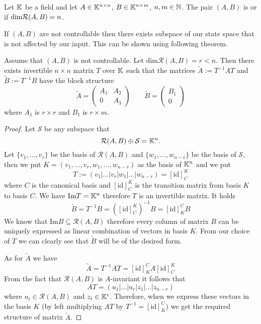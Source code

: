 \begin{definition}
	Let $\mathbb{K}$ be a field and let $A \in \mathbb{K}^{n \times n}$, $B \in \mathbb{K}^{n \times m}$, $n,m \in \mathbb{N}$. The pair $(A,B)$ is  or  if $\textnormal{dim}\mathcal{R}(A,B)=n$.
\end{definition}

If $(A,B)$ are not controllable then there exists subspace of our state space that is not affected by our input. This can be shown using following theorem.

\begin{theorem}
	\label{theorem:decomp}
	Assume that $(A,B)$ is not controllable. Let $\text{dim}\mathcal{R}(A,B)=r<n$. Then there exists invertible $n\times n$ matrix $T$ over $\mathbb{K}$ such that the matrices $\widetilde{A}:=T^{-1}AT$ and $\widetilde{B}:=T^{-1}B$ have the block structure 
	\begin{equation*}
		\widetilde{A}=
		\begin{pmatrix}
			A_1 & A_2 \\
			0   & A_3 
		\end{pmatrix}
		\qquad
		\widetilde{B}=
		\begin{pmatrix}
			B_1  \\
			0
		\end{pmatrix}
	\end{equation*}
	where $A_1$ is $r \times r$ and $B_1$ is $r \times m$.
\end{theorem}

\begin{proof}
	Let $\mathcal{S}$ be any subspace that $$\mathcal{R}(A,B)\oplus\mathcal{S}=\mathbb{K}^n.$$ Let $\{v_1,\ldots,v_r\}$ be the basis of $\mathcal{R}(A,B)$ and $\{w_1,\ldots,w_{n-r}\}$ be the basis of $\mathcal{S}$, then we put $K=(v_1,\ldots,v_r,w_1,\ldots,w_{n-r})$ as the basis of $\mathbb{K}^n$ and we put $$T:=(v_1|\ldots|v_r|w_1|\ldots|w_{n-r})=[\text{id}]^K_C$$ where $C$ is the canonical basis and $[\text{id}]^K_C$ is the transition matrix from basis $K$ to basis $C$. We have $\text{Im}T=\mathbb{K}^n$ therefore $T$ is an invertible matrix. It holds $$\widetilde{B}=T^{-1}B=([\text{id}]^K_C)^{-1}B=[\text{id}]^C_KB$$ We know that $\text{Im}B\subseteq\mathcal{R}(A,B)$ therefore every column of matrix $B$ can be uniquely expressed as linear combination of vectors in basis $K$. From our choice of $T$ we can clearly see that $\widetilde{B}$ will be of the desired form.
	
	As for $\widetilde{A}$ we have $$\widetilde{A}=T^{-1}AT=[\text{id}]^C_KA[\text{id}]^K_C$$ From the fact that $\mathcal{R}(A,B)$ is $A$-invariant it follows that $$AT=(u_1|\ldots|u_r|z_1|\ldots|z_{n-r})$$ where $u_i \in \mathcal{R}(A,B)$ and $z_i \in \mathbb{K}^i$. Therefore, when we express these vectors in the basis $K$ (by left multiplying $AT$ by $T^{-1}=[\text{id}]^C_K$) we get the required structure of matrix $\widetilde{A}$.
\end{proof}

